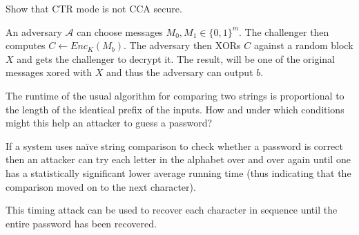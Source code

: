 \documentclass{supervision}
\begin{document}
\begin{questions}
    \question Show that CTR mode is not CCA secure.

      \begin{solution}
        An adversary $\mathcal{A}$ can choose messages $M_0, M_1 \in
        \{ 0,1 \} ^m $. The challenger then computes $C \leftarrow Enc_K(M_b)$.
        The adversary then XORs $C$ against a random block $X$ and gets the
        challenger to decrypt it. The result, will be one of the original
        messages xored with $X$ and thus the adversary can output $b$.
      \end{solution}

    \question The runtime of the usual algorithm for comparing two strings is
      proportional to the length of the identical prefix of the inputs. How and
      under which conditions might this help an attacker to guess a password?

      \begin{solution}
        If a system uses naïve string comparison to check whether a password is
        correct then an attacker can try each letter in the alphabet over and
        over again until one has a statistically significant lower average
        running time (thus indicating that the comparison moved on to the next
        character).

        This timing attack can be used to recover each character in sequence
        until the entire password has been recovered.
      \end{solution}

    \question
\end{questions}
\end{document}
